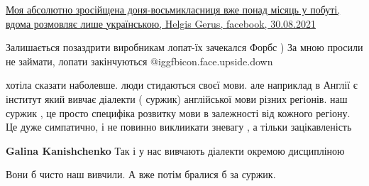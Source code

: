 \begin{itemize}
\href{https://www.facebook.com/ol.geras.98/posts/808711979809806}{%
Моя абсолютно зросійщена доня-восьмикласниця вже понад місяць у побуті, вдома розмовляє лише українською, %
Helgis Gerus, facebook, 30.08.2021%
}

 
Залишається позаздрити виробникам лопат-їх зачекался Форбс ) За мною просили не
займати, лопати закінчуються  @igg{fbicon.face.upside.down} 

 

хотіла сказати наболевше. люди стидаються своєї мови. але наприклад в Англії є
інститут який вивчає діалекти ( суржик) англійської мови різних регіонів. наш
суржик , це просто специфіка розвитку мови в залежності від кожного регіону. Це
дуже симпатично, і не повинно виклиикати зневагу , а тільки зацікавленість

\begin{itemize}
 
\textbf{Galina Kanishchenko} Так і у нас вивчають діалекти окремою дисципліною
\end{itemize}

 
Вони б чисто наш вивчили. А вже потім бралися б за суржик.

\begin{itemize}
 

\end{itemize}
\end{itemize}
